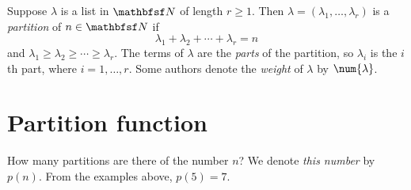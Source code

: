 Suppose $\lambda $ is a list in $\N  $ of length $r \geq 1$.
Then $\lambda  = (\lambda _1, \dots , \lambda _r)$ is a \textit{partition} of $n \in \N  $ if
\[
\lambda _1 + \lambda _2 + \cdots + \lambda _r = n
\]
and $\lambda _1 \geq \lambda _2 \geq \cdots \geq \lambda _r$.
The terms of $\lambda $ are the \textit{parts} of the partition, so $\lambda _i$ is the $i$th part, where $i = 1, \dots , r$.
Some authors denote the \textit{weight} of $\lambda $ by $\num{\lambda }$.

\section*{Partition function}

How many partitions are there of the number $n$?
We denote \textit{this number} by $p(n).$
From the examples above, $p(5) = 7$.

\blankpage